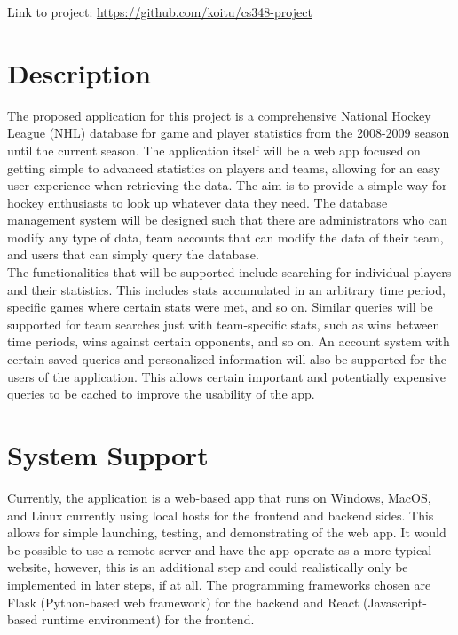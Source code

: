\documentclass[11pt]{article}
\begin{document}
Link to project: \url{https://github.com/koitu/cs348-project}

\section{Description}

The proposed application for this project is a comprehensive National Hockey League (NHL) database for game and player statistics from the 2008-2009 season until the current season. The application itself will be a web app focused on getting simple to advanced statistics on players and teams, allowing for an easy user experience when retrieving the data. The aim is to provide a simple way for hockey enthusiasts to look up whatever data they need. The database management system will be designed such that there are administrators who can modify any type of data, team accounts that can modify the data of their team, and users that can simply query the database. \\

The functionalities that will be supported include searching for individual players and their statistics. This includes stats accumulated in an arbitrary time period, specific games where certain stats were met, and so on. Similar queries will be supported for team searches just with team-specific stats, such as wins between time periods, wins against certain opponents, and so on. An account system with certain saved queries and personalized information will also be supported for the users of the application. This allows certain important and potentially expensive queries to be cached to improve the usability of the app.


\section{System Support}
Currently, the application is a web-based app that runs on Windows, MacOS, and Linux currently using local hosts for the frontend and backend sides. This allows for simple launching, testing, and demonstrating of the web app. It would be possible to use a remote server and have the app operate as a more typical website, however, this is an additional step and could realistically only be implemented in later steps, if at all. The programming frameworks chosen are Flask (Python-based web framework) for the backend and React (Javascript-based runtime environment) for the frontend. \\
\end{document}
